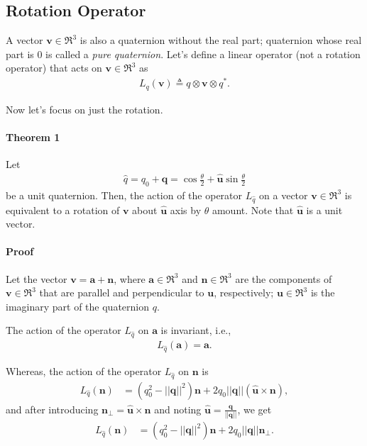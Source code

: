 \subsection{Rotation Operator}
\hspace{\parindent}A vector $\boldsymbol{v} \in\Re^3$ is also a quaternion without the real part; quaternion whose real part is $0$ is called a \textit{pure quaternion}. Let's define a linear operator (not a rotation operator) that acts on $\boldsymbol{v} \in\Re^3$ as
\begin{align}
    L_q(\boldsymbol{v}) \triangleq q \otimes \boldsymbol{v} \otimes q^*.
    \label{eqn:LOperator}
\end{align}

Now let's focus on just the rotation.

\paragraph{Theorem 1}Let
\begin{align}
    \hat q = q_0 + \boldsymbol{q} = \cos{\frac{\theta}{2} + \boldsymbol{\hat u} \sin{\frac{\theta}{2}}}
    \label{eqn:unitQuaternion}
\end{align}
be a unit quaternion. Then, the action of the operator $L_{\hat q}$ on a vector $\boldsymbol{v} \in\Re^3$ is equivalent to a rotation of $\boldsymbol{v}$ about $\boldsymbol{\hat u}$ axis by $\theta$ amount. Note that $\boldsymbol{\hat u}$ is a unit vector.

\paragraph{Proof} Let the vector $\boldsymbol{v} = \boldsymbol{a} + \boldsymbol{n}$, where $\boldsymbol{a} \in\Re^3$ and $\boldsymbol{n} \in\Re^3$ are the components of $\boldsymbol{v} \in\Re^3$ that are parallel and perpendicular to $\boldsymbol{u}$, respectively; $\boldsymbol{u} \in\Re^3$ is the imaginary part of the quaternion $q$.

The action of the operator $L_{\hat q}$ on $\boldsymbol{a}$ is invariant, i.e.,
\begin{align}
    L_{\hat q}(\boldsymbol{a}) = \boldsymbol{a}.
    \label{eqn:rotationOperationOnParallelComponent}
\end{align}

Whereas, the action of the operator $L_{\hat q}$ on $\boldsymbol{n}$ is
\begin{align}
    L_{\hat q}(\boldsymbol{n}) &= (q_0^2 - ||\boldsymbol{q}||^2) \boldsymbol n + 2 q_0 ||\boldsymbol{q}|| (\boldsymbol{\hat u} \times \boldsymbol{n}),
    \label{eqn:rotationOperationOnPerpendicularComponent1}
\end{align}
and after introducing $\boldsymbol{n}_{\perp} = \boldsymbol{\hat u} \times \boldsymbol{n}$ and noting $\boldsymbol{\hat u} = \frac{\boldsymbol{q}}{||\boldsymbol{q}||}$, we get
\begin{align}
    L_{\hat q}(\boldsymbol{n}) &= (q_0^2 - ||\boldsymbol{q}||^2) \boldsymbol n + 2 q_0 ||\boldsymbol{q}|| \boldsymbol{n}_{\perp}.
    \label{eqn:rotationOperationOnPerpendicularComponent2}
\end{align}

